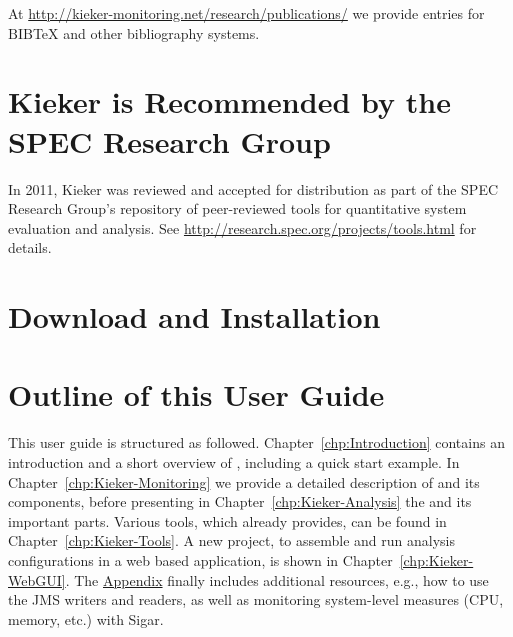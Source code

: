 		\noindent At \url{http://kieker-monitoring.net/research/publications/} we provide entries for $\mathrm{B\scriptstyle IB}\!$\TeX{} and other bibliography systems.

	\section{Kieker is Recommended by the SPEC Research Group}
		In 2011, Kieker was reviewed and accepted for distribution as part of the SPEC Research Group's repository of peer-reviewed tools for quantitative system evaluation and analysis. See \url{http://research.spec.org/projects/tools.html} for details.
	
	\section{Download and Installation}
		
	\section{Outline of this User Guide}
		This user guide is structured as followed. Chapter~\ref{chp:Introduction} contains an introduction and a short overview of \Kieker{}, including a quick start example. In Chapter~\ref{chp:Kieker-Monitoring} we provide a detailed description of \KiekerMonitoringPart{} and its components, before presenting in Chapter~\ref{chp:Kieker-Analysis} the \KiekerAnalysisPart{} and its important parts. Various tools, which \Kieker{} already provides, can be found in Chapter~\ref{chp:Kieker-Tools}. A new project, to assemble and run analysis configurations in a web based application, is shown in Chapter~\ref{chp:Kieker-WebGUI}. The \hyperlink{hypertarget:appendix}{Appendix} finally includes additional resources, e.g., how to use the JMS writers and readers, as well as monitoring system-level measures (CPU, memory, etc.) with Sigar. 

		\vspace{1cm}

